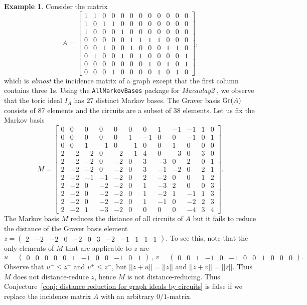\documentclass[a4paper, 12pt]{article}
\theoremstyle{plain}
\theoremstyle{definition}
\newtheorem{example}[theorem]{Example}
\theoremstyle{remark}
\begin{document}
\begin{example}
Consider the matrix 
\[
A = 
    \begin{bmatrix}
      1&1&0&0&0&0&0&0&0&0&0&0\\
      1&0&1&1&0&0&0&0&0&0&0&0\\
      1&0&0&0&1&0&0&0&0&0&0&0\\
      0&0&0&0&0&1&1&1&1&0&0&0\\
      0&0&1&0&0&1&0&0&0&1&1&0\\
      0&1&0&0&1&0&1&0&0&0&0&1\\
      0&0&0&0&0&0&0&1&0&1&0&1\\
      0&0&0&1&0&0&0&0&1&0&1&0 
    \end{bmatrix},
\]
which is \textit{almost} the incidence matrix of a graph except that the first column contains three $1$s.
Using the \texttt{AllMarkovBases} package \cite{CM_2025} for \textit{Macaulay2} \cite{M2}, we observe that the toric ideal $I_A$ has $27$ distinct  Markov bases. The Graver basis ${\rm Gr}(A)$ consists of $87$ elements and the circuits are a subset of $38$ elements. Let us fix the Markov basis
\[
M = 
\begin{bmatrix}
      0&0&0&0&0&0&0&1&-1&-1&1&0\\
      0&0&0&0&0&1&-1&0&0&-1&0&1\\
      0&0&1&-1&0&-1&0&0&1&0&0&0\\
      2&-2&-2&0&-2&-1&4&0&-3&0&3&0\\
      2&-2&-2&0&-2&0&3&-3&0&2&0&1\\
      2&-2&-2&0&-2&0&3&-1&-2&0&2&1\\
      2&-2&-1&-1&-2&0&2&-2&0&0&1&2\\
      2&-2&0&-2&-2&0&1&-3&2&0&0&3\\
      2&-2&0&-2&-2&0&1&-2&1&-1&1&3\\
      2&-2&0&-2&-2&0&1&-1&0&-2&2&3\\
      2&-2&1&-3&-2&0&0&0&0&-4&3&4
\end{bmatrix}.
\]
The Markov basis $M$ reduces the distance of all circuits of $A$ but it fails to reduce the distance of the Graver basis element
$
z = \begin{pmatrix}2& -2& -2& 0& -2& 0& 3& -2& -1& 1& 1& 1 \end{pmatrix}
$.
To see this, note that the only elements of $M$ that are applicable to $z$ are
\[
u = \begin{pmatrix}0&0&0&0&0&1&-1&0&0&-1&0&1\end{pmatrix}\,,
\
v = \begin{pmatrix}0&0&1&-1&0&-1&0&0&1&0&0&0\end{pmatrix}.
\]
Observe that $u^- \le z^+$ and $v^+ \le z^-$, but $||z+u|| = ||z||$ and $||z+v|| = ||z||$. Thus $M$ does not distance-reduce $z$, hence $M$ is not distance-reducing. Thus Conjecture~\ref{conj: distance reduction for graph ideals by circuits} is false if we replace the incidence matrix $A$ with an arbitrary $0/1$-matrix.
\end{example}
\end{document}
